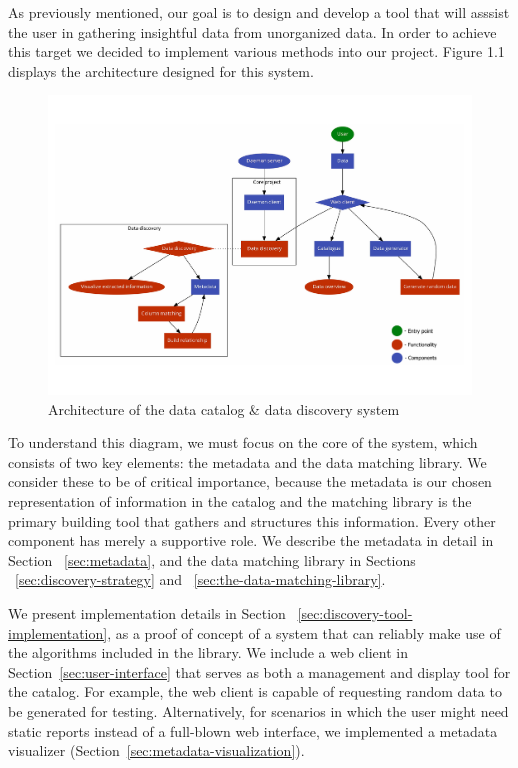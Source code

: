 As previously mentioned, our goal is to design and develop a tool that will asssist the user in gathering insightful data from unorganized data.
In order to achieve this target we decided to implement various methods into our project.
Figure 1.1 displays the architecture designed for this system.
\begin {figure} [h]
    \centering
    \includegraphics[width=16cm]{figures/architecture}
    \caption {Architecture of the data catalog \& data discovery system}
    \label {fig:architecture_diagram}
\end{figure}

To understand this diagram, we must focus on the core of the system, which consists of two key elements: the metadata and
the data matching library.
We consider these to be of critical importance, because the metadata is our chosen representation of information in the
catalog and the matching library is the primary building tool that gathers and structures this information.
Every other component has merely a supportive role.
We describe the metadata in detail in Section ~\ref{sec:metadata}, and the data matching library in Sections
~\ref{sec:discovery-strategy} and ~\ref{sec:the-data-matching-library}.

We present implementation details in Section ~\ref{sec:discovery-tool-implementation}, as a proof of concept of a system
that can reliably make use of the algorithms included in the library.
We include a web client in Section~\ref{sec:user-interface} that serves as both a management and display tool for the catalog.
For example, the web client is capable of requesting random data to be generated for testing.
Alternatively, for scenarios in which the user might need static reports instead of a full-blown web interface, we implemented
a metadata visualizer (Section~\ref{sec:metadata-visualization}).

